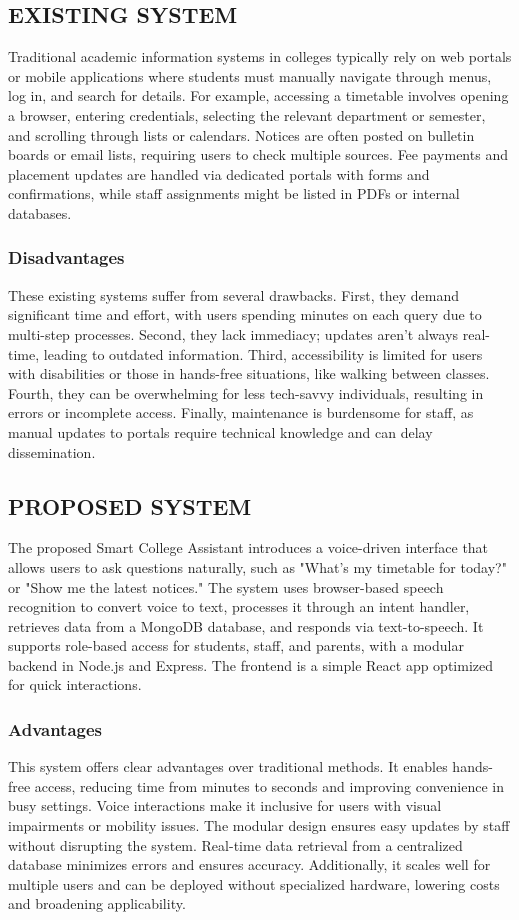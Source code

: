\documentclass{article}
\begin{document}
\subsection{EXISTING SYSTEM}
Traditional academic information systems in colleges typically rely on web portals or mobile applications where students must manually navigate through menus, log in, and search for details. For example, accessing a timetable involves opening a browser, entering credentials, selecting the relevant department or semester, and scrolling through lists or calendars. Notices are often posted on bulletin boards or email lists, requiring users to check multiple sources. Fee payments and placement updates are handled via dedicated portals with forms and confirmations, while staff assignments might be listed in PDFs or internal databases.

\subsubsection{Disadvantages}
These existing systems suffer from several drawbacks. First, they demand significant time and effort, with users spending minutes on each query due to multi-step processes. Second, they lack immediacy; updates aren't always real-time, leading to outdated information. Third, accessibility is limited for users with disabilities or those in hands-free situations, like walking between classes. Fourth, they can be overwhelming for less tech-savvy individuals, resulting in errors or incomplete access. Finally, maintenance is burdensome for staff, as manual updates to portals require technical knowledge and can delay dissemination.

\subsection{PROPOSED SYSTEM}
The proposed Smart College Assistant introduces a voice-driven interface that allows users to ask questions naturally, such as "What's my timetable for today?" or "Show me the latest notices." The system uses browser-based speech recognition to convert voice to text, processes it through an intent handler, retrieves data from a MongoDB database, and responds via text-to-speech. It supports role-based access for students, staff, and parents, with a modular backend in Node.js and Express. The frontend is a simple React app optimized for quick interactions.

\subsubsection{Advantages}
This system offers clear advantages over traditional methods. It enables hands-free access, reducing time from minutes to seconds and improving convenience in busy settings. Voice interactions make it inclusive for users with visual impairments or mobility issues. The modular design ensures easy updates by staff without disrupting the system. Real-time data retrieval from a centralized database minimizes errors and ensures accuracy. Additionally, it scales well for multiple users and can be deployed without specialized hardware, lowering costs and broadening applicability.
\end{document}

